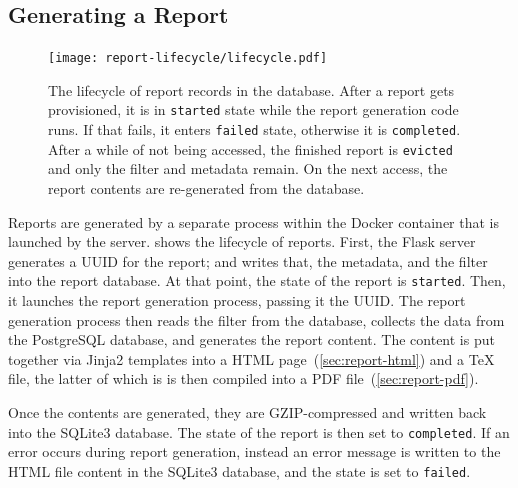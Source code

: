 \subsection{Generating a Report}
\label{sec:report-generation}
\label{sec:report-lifecycle}

\begin{figure}[tbp]
  \centering
  \texttt{[image: report-lifecycle/lifecycle.pdf]}

  \caption{
    The lifecycle of report records in the database.
    After a report gets provisioned, it is in \texttt{started} state while the report generation code runs.
    If that fails, it enters \texttt{failed} state, otherwise it is \texttt{completed}.
    After a while of not being accessed, the finished report is \texttt{evicted} and only the filter and metadata remain.
    On the next access, the report contents are re-generated from the database.
  }
  \label{fig:report-lifecycle}
\end{figure}


Reports are generated by a separate process within the Docker container that is launched by the server.
 shows the lifecycle of reports.
First, the Flask server generates a UUID for the report; and writes that, the metadata, and the filter into the report database.
At that point, the state of the report is \verb!started!.
Then, it launches the report generation process, passing it the UUID.
The report generation process then reads the filter from the database, collects the data from the PostgreSQL database, and generates the report content.
The content is put together via Jinja2 templates into a HTML page~(\cref{sec:report-html}) and a \TeX{} file, the latter of which is is then compiled into a PDF file~(\cref{sec:report-pdf}).

Once the contents are generated, they are GZIP-compressed and written back into the SQLite3 database.
The state of the report is then set to \verb!completed!.
If an error occurs during report generation, instead an error message is written to the HTML file content in the SQLite3 database, and the state is set to \verb!failed!.

